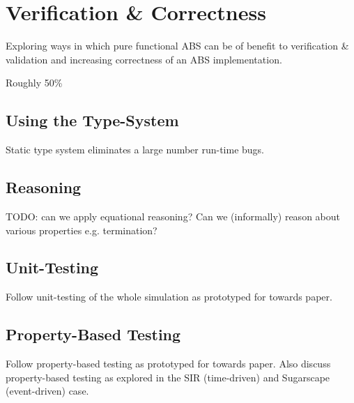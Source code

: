 \chapter{Verification \& Correctness}
Exploring ways in which pure functional ABS can be of benefit to verification \& validation and increasing correctness of an ABS implementation. 

Roughly 50\%

\section{Using the Type-System}
Static type system eliminates a large number run-time bugs.

\section{Reasoning}
TODO: can we apply equational reasoning? Can we (informally) reason about various properties e.g. termination?

\section{Unit-Testing}
Follow unit-testing of the whole simulation as prototyped for towards paper.

\section{Property-Based Testing}
Follow property-based testing as prototyped for towards paper. Also discuss property-based testing as explored in the SIR (time-driven) and Sugarscape (event-driven) case.
